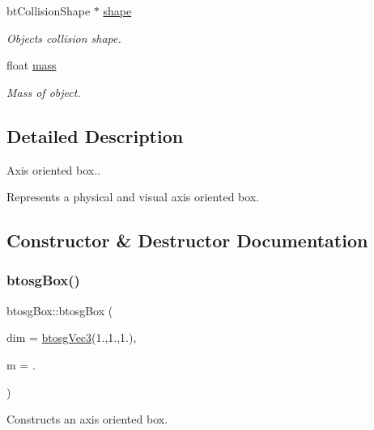 \begin{DoxyCompactItemize}
bt\+Collision\+Shape $\ast$ \hyperlink{classbtosgObject_a0f6a8da01cf643c321bffe86e42604b0}{shape}
\begin{DoxyCompactList}\small\item\em Object\textquotesingle{}s collision shape. \end{DoxyCompactList}\item 
float \hyperlink{classbtosgObject_a2418bb2194d5e9b0f1c51c84672ba7d1}{mass}
\begin{DoxyCompactList}\small\item\em Mass of object. \end{DoxyCompactList}\end{DoxyCompactItemize}


\subsection{Detailed Description}
Axis oriented box.. 

Represents a physical and visual axis oriented box. 

\subsection{Constructor \& Destructor Documentation}
\mbox{\label{classbtosgBox_aaffbdeeac3ee040dea98c19b538f0e49}} 
\subsubsection{\texorpdfstring{btosg\+Box()}{btosgBox()}\hspace{0.1cm}{\footnotesize\ttfamily [1/3]}}
{\footnotesize\ttfamily btosg\+Box\+::btosg\+Box (\begin{DoxyParamCaption}\item[{\hyperlink{classbtosgVec3}{btosg\+Vec3}}]{dim = {\ttfamily \hyperlink{classbtosgVec3}{btosg\+Vec3}(1.,1.,1.)},  }\item[{double}]{m = {.} }\end{DoxyParamCaption})\hspace{0.3cm}{\ttfamily [inline]}}

Constructs an axis oriented box. \mbox{\label{classbtosgBox_a0b7809cf498d50ced7c6e4a1bf0f5470}} 
